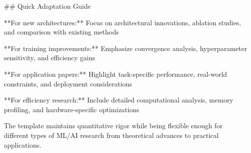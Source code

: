 \documentclass[11pt,a4paper]{article}
\begin{document}
## Quick Adaptation Guide

**For new architectures:** Focus on architectural innovations, ablation studies, and comparison with existing methods

**For training improvements:** Emphasize convergence analysis, hyperparameter sensitivity, and efficiency gains

**For application papers:** Highlight task-specific performance, real-world constraints, and deployment considerations

**For efficiency research:** Include detailed computational analysis, memory profiling, and hardware-specific optimizations

The template maintains quantitative rigor while being flexible enough for different types of ML/AI research from theoretical advances to practical applications.
\end{document}
